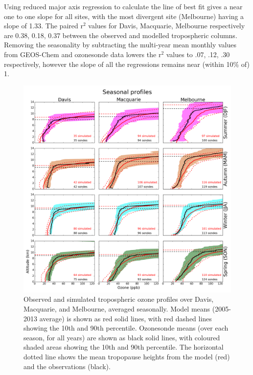 \documentclass{article}
\begin{document}
  Using reduced major axis regression to calculate the line of best fit gives a near one to one slope for all sites, with the most divergent site (Melbourne) having a slope of 1.33.
  The paired r$^2$ values for Davis, Macquarie, Melbourne respectively are 0.38, 0.18, 0.37 between the observed and modelled tropospheric columns.
  Removing the seasonality by subtracting the multi-year mean monthly values from GEOS-Chem and ozonesonde data lowers the r$^2$ values to .07, .12, .30 respectively, however the slope of all the regressions remains near (within 10\% of) 1.
  
  \begin{figure}[!htbp]
    \includegraphics[width=\textwidth]{figures/seasonalprofiles00.png}
    \caption{Observed and simulated tropospheric ozone profiles over Davis, Macquarie, and Melbourne, averaged seasonally.
    Model means (2005-2013 average) is shown as red solid lines, with red dashed lines showing the 10th and 90th percentile.
    Ozonesonde means (over each season, for all years) are shown as black solid lines, with coloured shaded areas showing the 10th and 90th percentile.
    The horizontal dotted line shows the mean tropopause heights from the model (red) and the observations (black).}
    \label{fig:GEOSChemSeasonalProfiles}
  \end{figure}
  
\end{document}
